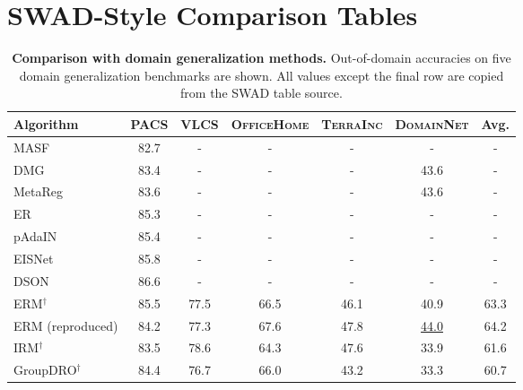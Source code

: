\documentclass[10pt]{article}
\newcommand{\data}[1]{\textsc{#1}}
\begin{document}
\section*{SWAD-Style Comparison Tables}

\begin{table}[H]
\centering
\small
\caption{\small {\bf Comparison with domain generalization methods.} Out-of-domain accuracies on five domain generalization benchmarks are shown. All values except the final row are copied from the SWAD table source.}
\label{table:full_table_cda}
\vspace{.5em}
\begin{tabular}{lccccc|c}
\toprule
\textbf{Algorithm}        & \data{PACS} & \data{VLCS}             & \data{OfficeHome}       & \data{TerraInc}   & \data{DomainNet}        & \textbf{Avg.}              \\
\midrule
MASF     & 82.7          & -             & -                   & -                 & -                  & -              \\
DMG      & 83.4          & -             & -                   & -                 & 43.6               & -              \\
MetaReg  & 83.6          & -             & -                   & -                 & 43.6               & -              \\
ER       & 85.3          & -             & -                   & -                 & -                  & -              \\
pAdaIN   & 85.4          & -             & -                   & -                 & -                  & -              \\
EISNet   & 85.8          & -             & -                   & -                 & -                  & -              \\
DSON     & 86.6          & -             & -                   & -                 & -                  & -              \\
ERM$^\dagger$      & 85.5          & 77.5          & 66.5                & 46.1              & 40.9               & 63.3           \\
ERM (reproduced)     & 84.2          & 77.3          & 67.6                & 47.8              & \underline{44.0}               & 64.2           \\
IRM$^\dagger$      & 83.5          & 78.6          & 64.3                & 47.6              & 33.9               & 61.6           \\
GroupDRO$^\dagger$ & 84.4          & 76.7          & 66.0                & 43.2              & 33.3               & 60.7           \\

\end{tabular}
\end{table}
\end{document}

